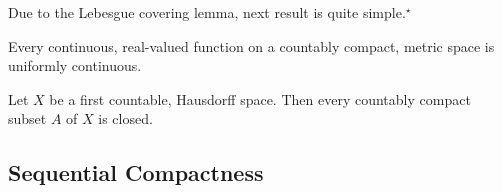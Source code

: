 Due to the Lebesgue covering lemma, next result is quite simple.$^\star$

\begin{theorem}
	Every continuous, real-valued function on a countably compact, metric space is uniformly continuous.
\end{theorem}

\begin{proposition}
	Let $X$ be a first countable, Hausdorff space. Then every countably compact subset $A$ of $X$ is closed.\cite[Exercises 11.1.7]{joshi}
\end{proposition}


\subsection{Sequential Compactness}
